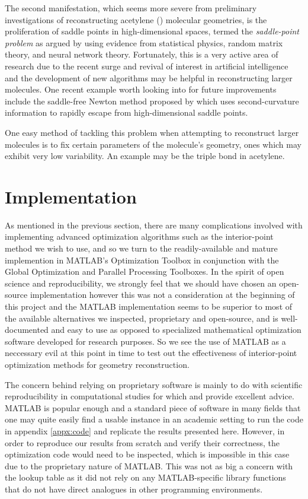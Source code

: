 The second manifestation, which seems more severe from preliminary investigations of reconstructing acetylene () molecular geometries, is the proliferation of saddle points in high-dimensional spaces, termed the \emph{saddle-point problem} as argued by \citet{Pascanu14} using evidence from statistical physics, random matrix theory, and neural network theory. Fortunately, this is a very active area of research due to the recent surge and revival of interest in artificial intelligence \citep{Bengio16,LeCun15} and the development of new algorithms may be helpful in reconstructing larger molecules. One recent example worth looking into for future improvements include the saddle-free Newton method proposed by \citet{Dauphin14} which uses second-curvature information to rapidly escape from high-dimensional saddle points.

One easy method of tackling this problem when attempting to reconstruct larger molecules is to fix certain parameters of the molecule's geometry, ones which may exhibit very low variability. An example may be the triple  bond in acetylene.

\section{Implementation} \label{sec:optImplementation}
As mentioned in the previous section, there are many complications involved with implementing advanced optimization algorithms such as the interior-point method we wish to use, and so we turn to the readily-available and mature implemention in MATLAB's Optimization Toolbox in conjunction with the Global Optimization and Parallel Processing Toolboxes. In the spirit of open science and reproducibility, we strongly feel that we should have chosen an open-source implementation however this was not a consideration at the beginning of this project and the MATLAB implementation seems to be superior to most of the available alternatives we inspected, proprietary and open-source, and is well-documented and easy to use as opposed to specialized mathematical optimization software developed for research purposes. So we see the use of MATLAB as a neccessary evil at this point in time to test out the effectiveness of interior-point optimization methods for geometry reconstruction.

The concern behind relying on proprietary software is mainly to do with scientific reproducibility in computational studies \citep{Easterbrook14} for which \citet{Millman14} and \citet{Wilson14} provide excellent advice. MATLAB is popular enough and a standard piece of software in many fields that one may quite easily find a usable instance in an academic setting to run the code in appendix \ref{appx:code} and replicate the results presented here. However, in order to reproduce our results from scratch and verify their correctness, the optimization code would need to be inspected, which is impossible in this case due to the proprietary nature of MATLAB. This was not as big a concern with the lookup table as it did not rely on any MATLAB-specific library functions that do not have direct analogues in other programming environments.

